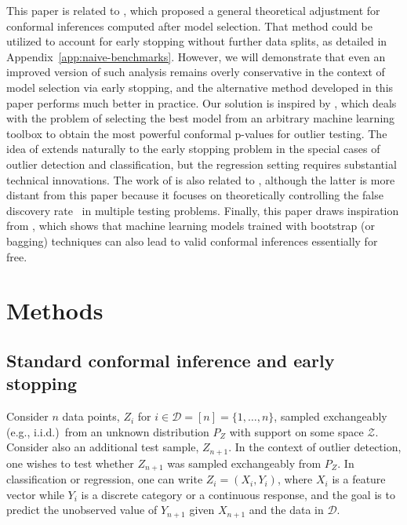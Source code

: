 This paper is related to \citet{efficiency_first_cp}, which proposed a general theoretical adjustment for conformal inferences computed after model selection. That method could be utilized to account for early stopping without further data splits, as detailed in Appendix~\ref{app:naive-benchmarks}. However, we will demonstrate that even an improved version of such analysis remains overly conservative in the context of model selection via early stopping, and the alternative method developed in this paper performs much better in practice.
Our solution is inspired by \citet{Liang_2022_integrative_p_val}, which deals with the problem of selecting the best model from an arbitrary machine learning toolbox  to obtain the most powerful conformal p-values for outlier testing. The idea of \citet{Liang_2022_integrative_p_val} extends naturally to the early stopping problem in the special cases of outlier detection and classification, but the regression setting requires substantial technical innovations.
The work of \citet{Liang_2022_integrative_p_val} is also related to \citet{marandon2022machine}, although the latter is more distant from this paper because it focuses on theoretically controlling the false discovery rate~\cite{benjamini1995controlling}  in multiple testing problems.
Finally, this paper draws inspiration from \citet{kim2020predictive}, which shows that machine learning models trained with bootstrap (or bagging) techniques can also lead to valid conformal inferences essentially for free.


\section{Methods} \label{sec:ces}

\subsection{Standard conformal inference and early stopping} \label{sec:setup}

Consider $n$ data points, $Z_i$ for $i \in \mathcal{D} = [n] = \{1,\ldots,n\}$, sampled exchangeably (e.g., i.i.d.)~from an unknown distribution $P_{Z}$ with support on some space $\mathcal{Z}$. Consider also an additional test sample, $Z_{n+1}$. 
In the context of outlier detection, one wishes to test whether $Z_{n+1}$ was sampled exchangeably from $P_Z$.
In classification or regression, one can write $Z_i = (X_i, Y_i)$, where $X_i$ is a feature vector while $Y_i$ is a discrete category or a continuous response, and the goal is to predict the unobserved value of $Y_{n+1}$ given $X_{n+1}$ and the data in $\mathcal{D}$.

